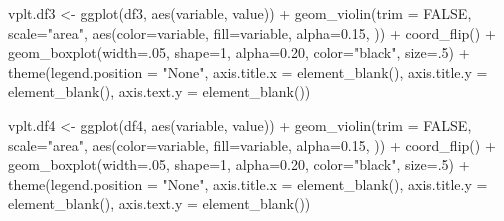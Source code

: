\documentclass[
]{article}
\newenvironment{Shaded}{\begin{snugshade}}{\end{snugshade}}
\newcommand{\AttributeTok}[1]{\textcolor[rgb]{0.77,0.63,0.00}{#1}}
\newcommand{\ConstantTok}[1]{\textcolor[rgb]{0.00,0.00,0.00}{#1}}
\newcommand{\DecValTok}[1]{\textcolor[rgb]{0.00,0.00,0.81}{#1}}
\newcommand{\FloatTok}[1]{\textcolor[rgb]{0.00,0.00,0.81}{#1}}
\newcommand{\FunctionTok}[1]{\textcolor[rgb]{0.00,0.00,0.00}{#1}}
\newcommand{\NormalTok}[1]{#1}
\newcommand{\OtherTok}[1]{\textcolor[rgb]{0.56,0.35,0.01}{#1}}
\newcommand{\SpecialCharTok}[1]{\textcolor[rgb]{0.00,0.00,0.00}{#1}}
\newcommand{\StringTok}[1]{\textcolor[rgb]{0.31,0.60,0.02}{#1}}
\begin{document}
\begin{Shaded}
\begin{Highlighting}[]
\NormalTok{vplt.df3 }\OtherTok{\textless{}{-}} \FunctionTok{ggplot}\NormalTok{(df3, }\FunctionTok{aes}\NormalTok{(variable, value)) }\SpecialCharTok{+} 
  \FunctionTok{geom\_violin}\NormalTok{(}\AttributeTok{trim =} \ConstantTok{FALSE}\NormalTok{, }\AttributeTok{scale=}\StringTok{"area"}\NormalTok{, }
              \FunctionTok{aes}\NormalTok{(}\AttributeTok{color=}\NormalTok{variable, }\AttributeTok{fill=}\NormalTok{variable, }\AttributeTok{alpha=}\FloatTok{0.15}\NormalTok{, )) }\SpecialCharTok{+} \FunctionTok{coord\_flip}\NormalTok{() }\SpecialCharTok{+} 
  \FunctionTok{geom\_boxplot}\NormalTok{(}\AttributeTok{width=}\NormalTok{.}\DecValTok{05}\NormalTok{, }\AttributeTok{shape=}\DecValTok{1}\NormalTok{, }\AttributeTok{alpha=}\FloatTok{0.20}\NormalTok{, }\AttributeTok{color=}\StringTok{"black"}\NormalTok{, }\AttributeTok{size=}\NormalTok{.}\DecValTok{5}\NormalTok{) }\SpecialCharTok{+} 
  \FunctionTok{theme}\NormalTok{(}\AttributeTok{legend.position =} \StringTok{"None"}\NormalTok{, }
        \AttributeTok{axis.title.x =} \FunctionTok{element\_blank}\NormalTok{(), }
        \AttributeTok{axis.title.y =} \FunctionTok{element\_blank}\NormalTok{(), }\AttributeTok{axis.text.y =} \FunctionTok{element\_blank}\NormalTok{())}

\NormalTok{vplt.df4 }\OtherTok{\textless{}{-}} \FunctionTok{ggplot}\NormalTok{(df4, }\FunctionTok{aes}\NormalTok{(variable, value)) }\SpecialCharTok{+} 
  \FunctionTok{geom\_violin}\NormalTok{(}\AttributeTok{trim =} \ConstantTok{FALSE}\NormalTok{, }\AttributeTok{scale=}\StringTok{"area"}\NormalTok{, }
              \FunctionTok{aes}\NormalTok{(}\AttributeTok{color=}\NormalTok{variable, }\AttributeTok{fill=}\NormalTok{variable, }\AttributeTok{alpha=}\FloatTok{0.15}\NormalTok{, )) }\SpecialCharTok{+} \FunctionTok{coord\_flip}\NormalTok{() }\SpecialCharTok{+} 
  \FunctionTok{geom\_boxplot}\NormalTok{(}\AttributeTok{width=}\NormalTok{.}\DecValTok{05}\NormalTok{, }\AttributeTok{shape=}\DecValTok{1}\NormalTok{, }\AttributeTok{alpha=}\FloatTok{0.20}\NormalTok{, }\AttributeTok{color=}\StringTok{"black"}\NormalTok{, }\AttributeTok{size=}\NormalTok{.}\DecValTok{5}\NormalTok{) }\SpecialCharTok{+} 
  \FunctionTok{theme}\NormalTok{(}\AttributeTok{legend.position =} \StringTok{"None"}\NormalTok{, }
        \AttributeTok{axis.title.x =} \FunctionTok{element\_blank}\NormalTok{(), }
        \AttributeTok{axis.title.y =} \FunctionTok{element\_blank}\NormalTok{(), }\AttributeTok{axis.text.y =} \FunctionTok{element\_blank}\NormalTok{())}



\end{Highlighting}
\end{Shaded}
\end{document}

